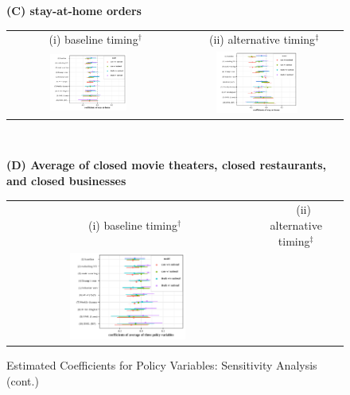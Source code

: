 \documentclass[3p, longtitle]{elsarticle}
\theoremstyle{definition}
\begin{document}
   \addtocounter{figure}{-1}
\begin{figure}[ht]
  \caption{Estimated Coefficients for Policy Variables:  Sensitivity Analysis (cont.) \label{fig:whisker-2}}\bigskip
  \begin{minipage}{\linewidth}
    \centering
   {\textbf{(C)  stay-at-home orders}}\\
    \medskip
    \begin{tabular}{cc}
 $\quad$  (i) baseline timing$^\dagger$ &$\quad$ (ii) alternative timing$^\ddagger$\\
      \includegraphics[width=0.5\textwidth]{tables_and_figures/pshelter-whisker-14}
      &
      \includegraphics[width=0.5\textwidth]{tables_and_figures/pshelter-whisker-7}
    \end{tabular}
  \end{minipage} \\ \smallskip
    \begin{minipage}{\linewidth}
    \centering
     {\textbf{(D)  Average of  closed movie theaters, closed restaurants, and closed  businesses}}\\
    \medskip
    \begin{tabular}{cc}
 $\quad$  (i) baseline timing$^\dagger$ &$\quad$ (ii) alternative timing$^\ddagger$\\
      \includegraphics[width=0.5\textwidth]{tables_and_figures/pindex-whisker-14}

\end{tabular}
\end{minipage}
\end{figure}
\end{document}
